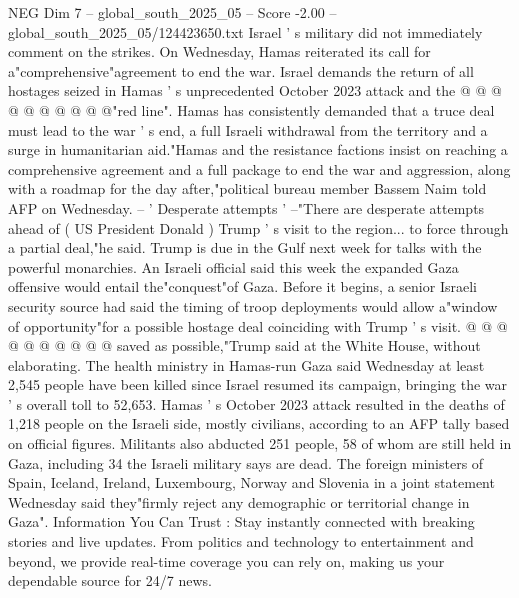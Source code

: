 \begin{textsample}{NEG Dim 7 – global\_south\_2025\_05 – Score -2.00 – global\_south\_2025\_05/124423650.txt}
Israel ' s military did not immediately comment on the strikes.
On Wednesday, Hamas reiterated its call for a"comprehensive"agreement to end the war.
Israel demands the return of all hostages seized in Hamas ' s unprecedented October 2023 attack and the @ @ @ @ @ @ @ @ @ @"red line".
Hamas has consistently demanded that a truce deal must lead to the war ' s end, a full Israeli withdrawal from the territory and a surge in humanitarian aid."Hamas and the resistance factions insist on reaching a comprehensive agreement and a full package to end the war and aggression, along with a roadmap for the day after,"political bureau member Bassem Naim told AFP on Wednesday. -- ' Desperate attempts ' --"There are desperate attempts ahead of ( US President Donald ) Trump ' s visit to the region... to force through a partial deal,"he said.
Trump is due in the Gulf next week for talks with the powerful monarchies.
An Israeli official said this week the expanded Gaza offensive would entail the"conquest"of Gaza.
Before it begins, a senior Israeli security source had said the timing of troop deployments would allow a"window of opportunity"for a possible hostage deal coinciding with Trump ' s visit. @ @ @ @ @ @ @ @ @ @ saved as possible,"Trump said at the White House, without elaborating.
The health ministry in Hamas-run Gaza said Wednesday at least 2,545 people have been killed since Israel resumed its campaign, bringing the war ' s overall toll to 52,653.
Hamas ' s October 2023 attack resulted in the deaths of 1,218 people on the Israeli side, mostly civilians, according to an AFP tally based on official figures.
Militants also abducted 251 people, 58 of whom are still held in Gaza, including 34 the Israeli military says are dead.
The foreign ministers of Spain, Iceland, Ireland, Luxembourg, Norway and Slovenia in a joint statement Wednesday said they"firmly reject any demographic or territorial change in Gaza".
Information You Can Trust : Stay instantly connected with breaking stories and live updates.
From politics and technology to entertainment and beyond, we provide real-time coverage you can rely on, making us your dependable source for 24/7 news.

\end{textsample}
